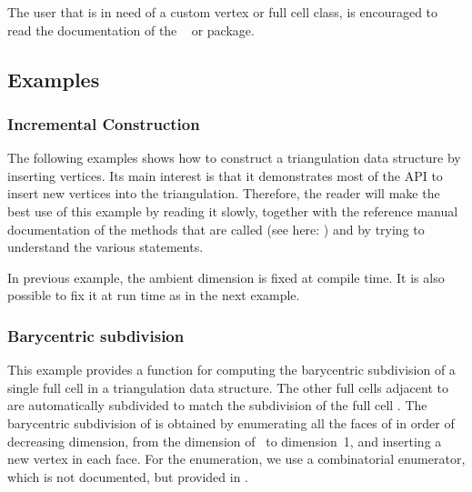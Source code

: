 \begin{ccAdvanced}
The user that is in need of a custom vertex or full cell class, is
encouraged to read the documentation of the \cgal\
  or   package. 
\end{ccAdvanced}


\subsection{Examples\label{triangulation:tds:examples}}

\subsubsection{Incremental Construction}
The following examples shows how to construct a triangulation data structure by
inserting vertices. Its main interest is that it demonstrates most of the API
to insert new vertices into the triangulation. Therefore, the reader will make
the best use of this example by reading it slowly, together with the reference
manual documentation of the methods that are called (see here:
) and by trying to understand the various 
\ccc{assert(...)} statements.


In previous example, the ambient dimension is fixed at compile time.
It is also possible to fix it at run time as in the next example.


\subsubsection{Barycentric subdivision}
This example provides a function for computing the barycentric subdivision of a
single full cell  in a triangulation data structure. The other 
full cells adjacent to  are automatically subdivided to match the
subdivision of the full cell . The barycentric subdivision of \ccc{c} is
obtained by enumerating all the faces of  in order of decreasing
dimension, from the dimension of~\ccc{c} to dimension~1, and inserting a new
vertex in each face. For the enumeration, we use a combinatorial enumerator,
which is not documented, but provided in \cgal.


